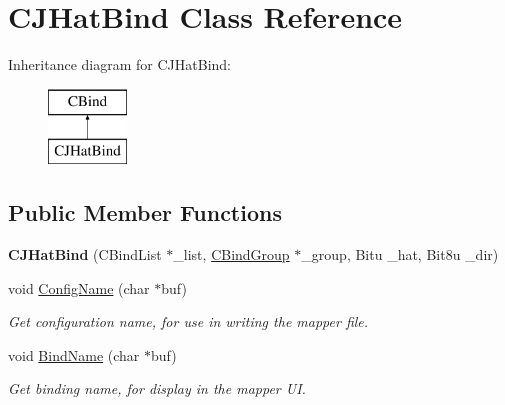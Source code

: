 \hypertarget{classCJHatBind}{\section{C\-J\-Hat\-Bind Class Reference}
\label{classCJHatBind}
}
Inheritance diagram for C\-J\-Hat\-Bind\-:\begin{figure}[H]
\begin{center}
\leavevmode
\includegraphics[height=2.000000cm]{classCJHatBind}
\end{center}
\end{figure}
\subsection*{Public Member Functions}
\begin{DoxyCompactItemize}
\item 
\hypertarget{classCJHatBind_af629c7834e53a8465c591e5547c5041e}{{\bfseries C\-J\-Hat\-Bind} (C\-Bind\-List $\ast$\-\_\-list, \hyperlink{classCBindGroup}{C\-Bind\-Group} $\ast$\-\_\-group, Bitu \-\_\-hat, Bit8u \-\_\-dir)}\label{classCJHatBind_af629c7834e53a8465c591e5547c5041e}

\item 
\hypertarget{classCJHatBind_a9924519ce8d673ecbf99a28028e29620}{void \hyperlink{classCJHatBind_a9924519ce8d673ecbf99a28028e29620}{Config\-Name} (char $\ast$buf)}\label{classCJHatBind_a9924519ce8d673ecbf99a28028e29620}

\begin{DoxyCompactList}\small\item\em Get configuration name, for use in writing the mapper file. \end{DoxyCompactList}\item 
\hypertarget{classCJHatBind_a913303466056ad7d6de27bb6f99d8cb9}{void \hyperlink{classCJHatBind_a913303466056ad7d6de27bb6f99d8cb9}{Bind\-Name} (char $\ast$buf)}\label{classCJHatBind_a913303466056ad7d6de27bb6f99d8cb9}

\begin{DoxyCompactList}\small\item\em Get binding name, for display in the mapper U\-I. \end{DoxyCompactList}\end{DoxyCompactItemize}

